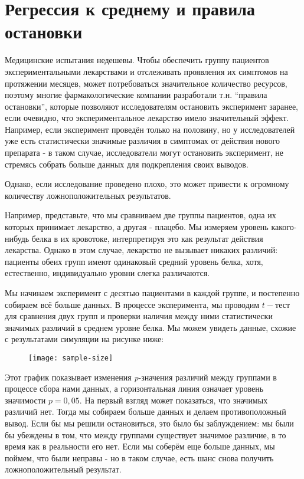 \chapter{Регрессия к среднему и правила остановки}
\label{chp7}

Медицинские испытания недешевы. Чтобы обеспечить группу пациентов экспериментальными лекарствами и отслеживать проявления их симптомов на протяжении месяцев, может потребоваться значительное количество ресурсов, поэтому многие фармакологические компании разработали т.н. ``правила остановки'', которые позволяют исследователям остановить эксперимент заранее, если очевидно, что экспериментальное лекарство имело значительный эффект. Например, если эксперимент проведён только на половину, но у исследователей уже есть статистически значимые различия в симптомах от действия нового препарата - в таком случае, исследователи могут остановить эксперимент, не стремясь собрать больше данных для подкрепления своих выводов.

Однако, если исследование проведено плохо, это может привести к огромному количеству ложноположительных результатов. 

Например, представьте, что мы сравниваем две группы пациентов, одна их которых принимает лекарство, а другая - плацебо. Мы измеряем уровень какого-нибудь белка в их кровотоке, интерпретируя это как результат действия лекарства. Однако в этом случае, лекарство не вызывает никаких различий: пациенты обеих групп имеют одинаковый средний уровень белка, хотя, естественно, индивидуально уровни слегка различаются. 

Мы начинаем эксперимент с десятью пациентами в каждой группе, и постепенно собираем всё больше данных. В процессе эксперимента, мы проводим $t-$тест для сравнения двух групп и проверки наличия между ними статистически значимых различий в среднем уровне белка. Мы можем увидеть данные, схожие с результатами симуляции на рисунке ниже:


\newpage %

\begin{figure}[h!]
    \centering
    \texttt{[image: sample-size]}
    \label{fig9:sample-size}
\end{figure}

Этот график показывает изменения \emph{p}-значения различий между группами в процессе сбора нами данных, а горизонтальная линия означает уровень значимости $p = 0,05$. На первый взгляд может показаться, что значимых различий нет. Тогда мы собираем больше данных и делаем противоположный вывод. Если бы мы решили остановиться, это было бы заблуждением: мы были бы убеждены в том, что между группами существует значимое различие, в то время как в реальности его нет. Если мы соберём еще больше данных, мы поймем, что были неправы - но в таком случае, есть шанс снова получить ложноположительный результат.  

